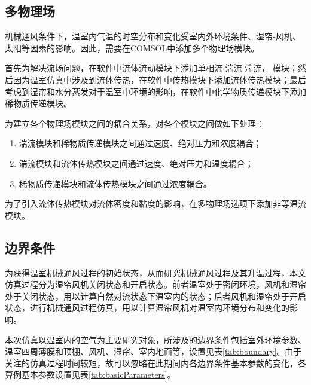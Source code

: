 	\subsection{多物理场}
	机械通风条件下，温室内气温的时空分布和变化受室内外环境条件、湿帘-风机、太阳等因素的影响。因此，需要在COMSOL中添加多个物理场模块。
	
首先为解决流场问题，在软件中流体流动模块下添加单相流-湍流-湍流， 模块；然后因为温室仿真中涉及到流体传热，在软件中传热模块下添加流体传热模块；最后考虑到湿帘和水分蒸发对于温室中环境的影响，在软件中化学物质传递模块下添加稀物质传递模块。

为建立各个物理场模块之间的耦合关系，对各个模块之间做如下处理：
	\begin{enumerate}
		\item 湍流模块和稀物质传递模块之间通过速度、绝对压力和浓度耦合；
		\item 湍流模块和流体传热模块之间通过速度、绝对压力和温度耦合；
		\item 稀物质传递模块和流体传热模块之间通过浓度耦合。
	\end{enumerate}
为了引入流体传热模块对流体密度和黏度的影响，在多物理场选项下添加非等温流模块。

	\subsection{边界条件}
	为获得温室机械通风过程的初始状态，从而研究机械通风过程及其升温过程，本文仿真过程分为湿帘风机关闭状态和开启状态。前者温室处于密闭环境，风机和湿帘处于关闭状态，用以计算自然对流状态下温室内的状态；后者风机和湿帘处于开启状态，进行机械通风过程仿真，用以计算湿帘风机对温室内环境分布和变化的影响。
	
本次仿真以温室内的空气为主要研究对象，所涉及的边界条件包括室外环境参数、温室四周薄膜和顶棚、风机、湿帘、室内地面等，设置见表\ref{tab:boundary}。由于关注的仿真过程时间较短，故可以忽略在此期间内各边界条件基本参数的变化，各算例基本参数设置见表\ref{tab:basicParameters}。

